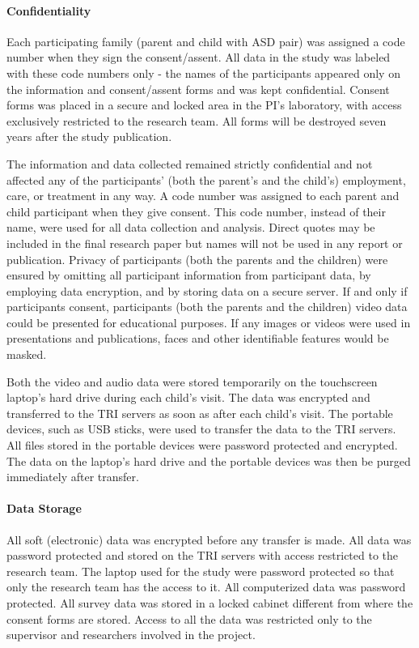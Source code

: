 \paragraph{Confidentiality}
Each participating family (parent and child with ASD pair) was assigned a code number when they sign the consent/assent. All data in the study was labeled with these code numbers only - the names of the participants appeared only on the information and consent/assent forms and was kept confidential. Consent forms was placed in a secure and locked area in the PI's laboratory, with access exclusively restricted to the research team. All forms will be destroyed seven years after the study publication. 

The information and data collected remained strictly confidential and not affected any of the participants' (both the parent's and the child's) employment, care, or treatment in any way. A code number was assigned to each parent and child participant when they give consent. This code number, instead of their name, were used for all data collection and analysis. Direct quotes may be included in the final research paper but names will not be used in any report or publication. Privacy of participants (both the parents and the children) were ensured by omitting all participant information from participant data, by employing data encryption, and by storing data on a secure server.  If and only if participants consent, participants (both the parents and the children) video data could be presented for educational purposes.  If any images or videos were used in presentations and publications, faces and other identifiable features would be masked.

Both the video and audio data were stored temporarily on the touchscreen laptop's hard drive during each child's visit. The data was encrypted and transferred to the TRI servers as soon as after each child's visit. The portable devices, such as USB sticks, were used to transfer the data to the TRI servers. All files stored in the portable devices were password protected and encrypted. The data on the laptop's hard drive and the portable devices was then be purged immediately after transfer. 

\paragraph{Data Storage}
All soft (electronic) data was encrypted before any transfer is made. All data was password protected and stored on the TRI servers with access restricted to the research team. The laptop used for the study were password protected so that only the research team has the access to it. All computerized data was password protected. All survey data was stored in a locked cabinet different from where the consent forms are stored. Access to all the data was restricted only to the supervisor and researchers involved in the project. 

